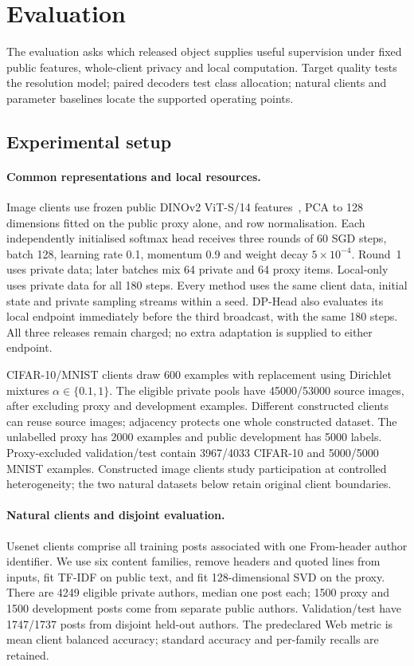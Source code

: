 \section{Evaluation}
\label{sec:eval}

The evaluation asks which released object supplies useful supervision under
fixed public features, whole-client privacy and local computation. Target
quality tests the resolution model; paired decoders test class allocation;
natural clients and parameter baselines locate the supported operating points.



\subsection{Experimental setup}
\label{sec:eval:setup}

\paragraph{Common representations and local resources.}
Image clients use frozen public DINOv2 ViT-S/14 features~\cite{oquab2023dinov2},
PCA to 128 dimensions fitted on the public proxy alone, and row normalisation.
Each independently initialised softmax head receives three rounds of 60 SGD
steps, batch 128, learning rate 0.1, momentum 0.9 and weight decay
$5\times10^{-4}$. Round~1 uses private data; later batches mix 64 private and
64 proxy items. Local-only uses private data for all 180 steps.
Every method uses the same client data, initial state and private sampling
streams within a seed. DP-Head also evaluates its local endpoint immediately
before the third broadcast, with the same 180 steps. All three releases remain
charged; no extra adaptation is supplied to either endpoint.

CIFAR-10/MNIST clients draw 600 examples with replacement using Dirichlet
mixtures $\alpha\in\{0.1,1\}$. The eligible private pools have
45000/53000 source images, after excluding proxy and development examples.
Different constructed clients can reuse source images; adjacency protects one
whole constructed dataset. The unlabelled proxy has 2000 examples and public
development has 5000 labels. Proxy-excluded validation/test contain 3967/4033
CIFAR-10 and 5000/5000 MNIST examples. Constructed image clients study
participation at controlled heterogeneity; the two natural datasets below
retain original client boundaries.

\paragraph{Natural clients and disjoint evaluation.}
Usenet clients comprise all training posts associated with one From-header
author identifier. We use six content families, remove headers and quoted
lines from inputs, fit TF-IDF on public text, and fit 128-dimensional SVD on
the proxy. There are 4249 eligible private authors, median one post each;
1500 proxy and 1500 development posts come from separate public authors.
Validation/test have 1747/1737 posts from disjoint held-out authors.
The predeclared Web metric is mean client balanced accuracy; standard accuracy
and per-family recalls are retained.


